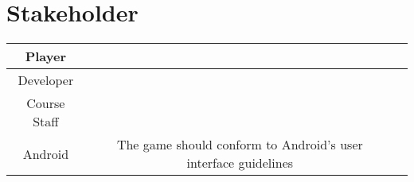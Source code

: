 \section{Stakeholder} 

\begin{tabular}{|c|c|c|}
\hline
Player & \\ \hline %
Developer & \\ \hline %
Course Staff &  \\ \hline %
Android & The game should conform to Android's user interface guidelines \cite{website:Android} %
\end{tabular}

